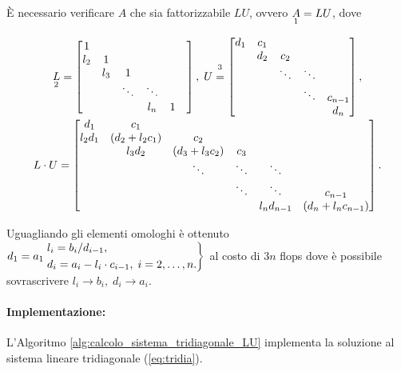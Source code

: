 È necessario verificare $A$ che sia fattorizzabile $LU$, ovvero $\underset{\footnotemark}{A}=LU$, dove
\begin{equation*}
	\begin{matrix}
		\underset{\footnotemark}{L}=
		\begin{bmatrix}
			1 & & & &\\
			l_2 & 1 & & &\\
			& l_3 & 1 & &\\
			& & \ddots & \ddots & &\\
			& & & l_n & 1
		\end{bmatrix}
		,\; U\overset{\footnotemark}{=}
		\begin{bmatrix}
			d_1 & c_1 &\\
			& d_2 & c_2\\
			& & \ddots & \ddots\\
			& & & \ddots & c_{n-1}\\
			& & & & d_n
		\end{bmatrix},\\
		L\cdot U=
		\begin{bmatrix}
			d_1 & c_1 & & & &\\
			l_2d_1 & (d_2+l_2 c_1) & c_2 & & &\\
			& l_3d_2 & (d_3+l_3c_2) & c_3 & &\\
			& & \ddots &\ddots & \ddots &\\
			& & & \ddots & \ddots & c_{n-1}\\
			& & & &  l_nd_{n-1} & (d_n+l_nc_{n-1})
		\end{bmatrix}.
	\end{matrix}
\end{equation*}
\addtocounter{footnote}{-1}


\noindent Uguagliando gli elementi omologhi è ottenuto\
$d_1=a_1\\
\begin{rcases}
	l_i=b_i/d_{i-1},\\
	d_i=a_i-l_i\cdot c_{i-1},\; i=2,\hdots, n.
\end{rcases}$
al costo di $3n$ flops dove è possibile sovrascrivere $l_i\rightarrow b_i,\; d_i\rightarrow a_i$.

\paragraph{Implementazione:} L'Algoritmo \ref{alg:calcolo_sistema_tridiagonale_LU} implementa la soluzione al sistema lineare tridiagonale (\ref{eq:tridia}).

